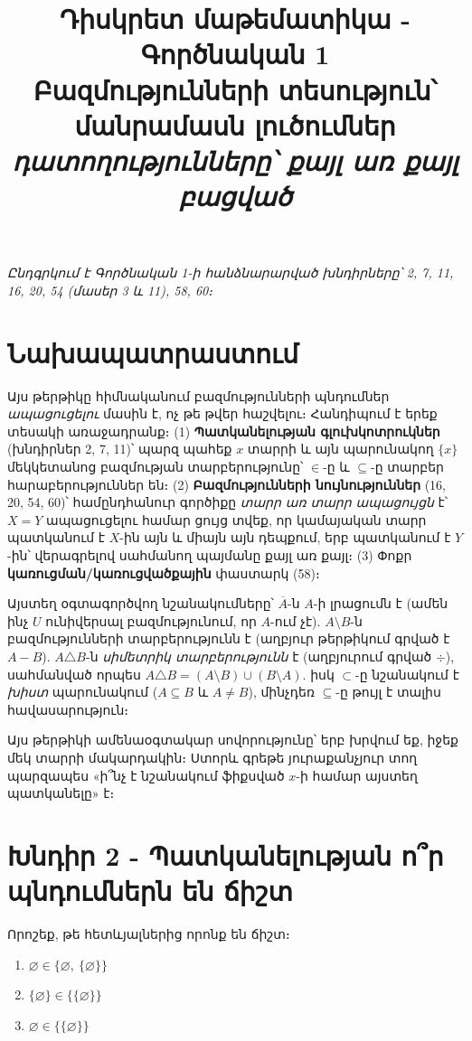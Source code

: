 \documentclass[11pt,a4paper]{article}
\title{\vspace{-1.2cm}\textbf{Դիսկրետ մաթեմատիկա - Գործնական 1}\\[2pt]
\large Բազմությունների տեսություն՝ մանրամասն լուծումներ\\[2pt]
\normalsize\itshape դատողությունները՝ քայլ առ քայլ բացված}
\author{}
\date{}
\newcommand{\symd}{\triangle}
\begin{document}
\maketitle
\vspace{-1.0cm}

\begin{center}\small\itshape Ընդգրկում է Գործնական 1-ի հանձնարարված խնդիրները՝ 2, 7, 11, 16, 20, 54 (մասեր 3 և 11), 58, 60։\end{center}

\section*{Նախապատրաստում}

Այս թերթիկը հիմնականում բազմությունների պնդումներ \emph{ապացուցելու} մասին է, ոչ թե թվեր հաշվելու։
Հանդիպում է երեք տեսակի առաջադրանք։ (1) \textbf{Պատկանելության գլուխկոտրուկներ} (խնդիրներ 2, 7, 11)՝
պարզ պահեք $x$ տարրի և այն պարունակող $\{x\}$ մեկկետանոց բազմության տարբերությունը՝ $\in$-ը և
$\subseteq$-ը տարբեր հարաբերություններ են։ (2) \textbf{Բազմությունների նույնություններ} (16, 20, 54,
60)՝ համընդհանուր գործիքը \emph{տարր առ տարր ապացույցն} է՝ $X=Y$ ապացուցելու համար ցույց տվեք, որ
կամայական տարր պատկանում է $X$-ին այն և միայն այն դեպքում, երբ պատկանում է $Y$-ին՝ վերագրելով սահմանող
պայմանը քայլ առ քայլ։ (3) Փոքր \textbf{կառուցման/կառուցվածքային} փաստարկ (58)։

Այստեղ օգտագործվող նշանակումները՝ $\overline{A}$-ն $A$-ի լրացումն է (ամեն ինչ $U$ ունիվերսալ
բազմությունում, որ $A$-ում չէ). $A\setminus B$-ն բազմությունների տարբերությունն է (աղբյուր թերթիկում
գրված է $A-B$). $A\symd B$-ն \emph{սիմետրիկ տարբերությունն} է (աղբյուրում գրված $\div$), սահմանված
որպես $A\symd B=(A\setminus B)\cup(B\setminus A)$. իսկ $\subset$-ը նշանակում է \emph{խիստ} պարունակում
($A\subseteq B$ և $A\neq B$), մինչդեռ $\subseteq$-ը թույլ է տալիս հավասարություն։

Այս թերթիկի ամենաօգտակար սովորությունը՝ երբ խրվում եք, իջեք մեկ տարրի մակարդակին։ Ստորև գրեթե
յուրաքանչյուր տող պարզապես «ի՞նչ է նշանակում ֆիքսված $x$-ի համար այստեղ պատկանելը» է։

\section*{Խնդիր 2 - Պատկանելության ո՞ր պնդումներն են ճիշտ}

\begin{problembox}[2]
Որոշեք, թե հետևյալներից որոնք են ճիշտ։
\begin{enumerate}[label=\textbf{2.\arabic*},leftmargin=2.2cm]
\item $\varnothing \in \{\varnothing,\ \{\varnothing\}\}$
\item $\{\varnothing\} \in \{\{\varnothing\}\}$
\item $\varnothing \in \{\{\varnothing\}\}$
\end{enumerate}
\end{problembox}
\end{document}

